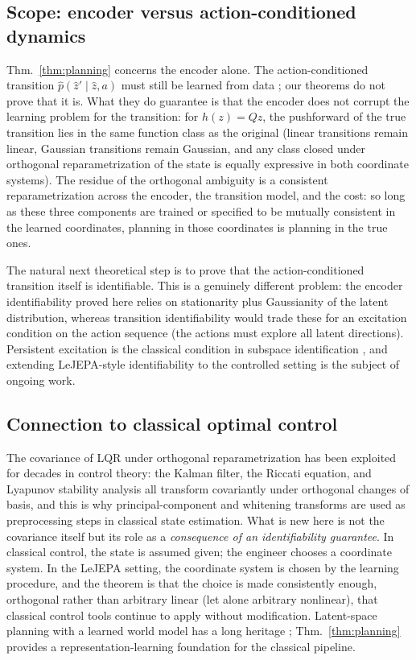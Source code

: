 \subsection{Scope: encoder versus action-conditioned dynamics}\label{app:planning-scope}

Thm.~\ref{thm:planning} concerns the encoder alone. The action-conditioned transition $\hat p(\hat z' \mid \hat z, a)$ must still be learned from data \citep{maes2026leworldmodel}; our theorems do not prove that it is. What they do guarantee is that the encoder does not corrupt the learning problem for the transition: for $h(z) = Qz$, the pushforward of the true transition lies in the same function class as the original (linear transitions remain linear, Gaussian transitions remain Gaussian, and any class closed under orthogonal reparametrization of the state is equally expressive in both coordinate systems). The residue of the orthogonal ambiguity is a consistent reparametrization across the encoder, the transition model, and the cost: so long as these three components are trained or specified to be mutually consistent in the learned coordinates, planning in those coordinates is planning in the true ones.

The natural next theoretical step is to prove that the action-conditioned transition itself is identifiable. This is a genuinely different problem: the encoder identifiability proved here relies on stationarity plus Gaussianity of the latent distribution, whereas transition identifiability would trade these for an excitation condition on the action sequence (the actions must explore all latent directions). Persistent excitation is the classical condition in subspace identification \citep{ahuja2023, buchholz2024}, and extending LeJEPA-style identifiability to the controlled setting is the subject of ongoing work.

\subsection{Connection to classical optimal control}\label{app:planning-classical}

The covariance of LQR under orthogonal reparametrization has been exploited for decades in control theory: the Kalman filter, the Riccati equation, and Lyapunov stability analysis all transform covariantly under orthogonal changes of basis, and this is why principal-component and whitening transforms are used as preprocessing steps in classical state estimation. What is new here is not the covariance itself but its role as a \emph{consequence of an identifiability guarantee}. In classical control, the state is assumed given; the engineer chooses a coordinate system. In the LeJEPA setting, the coordinate system is chosen by the learning procedure, and the theorem is that the choice is made consistently enough, orthogonal rather than arbitrary linear (let alone arbitrary nonlinear), that classical control tools continue to apply without modification. Latent-space planning with a learned world model has a long heritage \citep{brysonho1975, nguyen1990neural, ha2018world}; Thm.~\ref{thm:planning} provides a representation-learning foundation for the classical pipeline.



